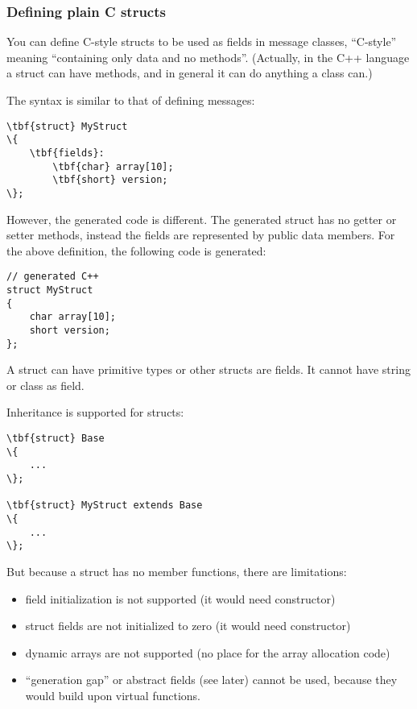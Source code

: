 \subsubsection{Defining plain C structs}

You can define C-style structs to be used as fields in message classes,
``C-style'' meaning ``containing only data and no methods''.
(Actually, in the C++ language a struct can have methods,
and in general it can do anything a class can.)

The syntax is similar to that of defining messages:

\begin{Verbatim}[commandchars=\\\{\}]
\tbf{struct} MyStruct
\{
    \tbf{fields}:
        \tbf{char} array[10];
        \tbf{short} version;
\};
\end{Verbatim}

However, the generated code is different. The generated struct has
no getter or setter methods, instead the fields are represented
by public data members. For the above definition, the
following code is generated:

\begin{verbatim}
// generated C++
struct MyStruct
{
    char array[10];
    short version;
};
\end{verbatim}

A struct can have primitive types or other structs are fields. It cannot
have string or class as field.

Inheritance is supported for structs:

\begin{Verbatim}[commandchars=\\\{\}]
\tbf{struct} Base
\{
    ...
\};

\tbf{struct} MyStruct extends Base
\{
    ...
\};
\end{Verbatim}

But because a struct has no member functions, there are limitations:

\begin{itemize}
   \item field initialization is not supported (it would need constructor)
   \item struct fields are not initialized to zero (it would need constructor)
   \item dynamic arrays are not supported (no place for the array allocation code)
   \item ``generation gap'' or abstract fields (see later) cannot be used,
      because they would build upon virtual functions.
\end{itemize}


